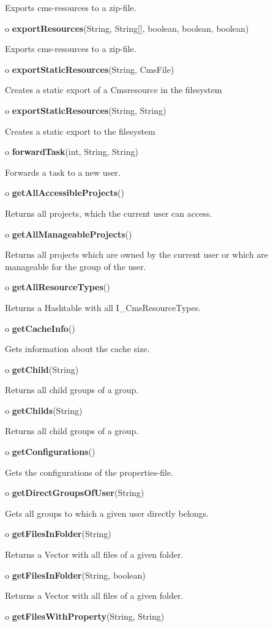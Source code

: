 \begin{description}
Exports cms-resources to a zip-file.
\item o {\bf exportResources}(String, String[], boolean, boolean, boolean)

Exports cms-resources to a zip-file.
\item o {\bf exportStaticResources}(String, CmsFile)

Creates a static export of a Cmsresource in the filesystem
\item o {\bf exportStaticResources}(String, String)

Creates a static export to the filesystem
\item o {\bf forwardTask}(int, String, String)

Forwards a task to a new user.
\item o {\bf getAllAccessibleProjects}()

Returns all projects, which the current user can access.
\item o {\bf getAllManageableProjects}()

Returns all projects which are owned by the current user or which are
manageable for the group of the user.
\item o {\bf getAllResourceTypes}()

Returns a Hashtable with all I\_CmsResourceTypes.
\item o {\bf getCacheInfo}()

Gets information about the cache size.
\item o {\bf getChild}(String)

Returns all child groups of a group.
\item o {\bf getChilds}(String)

Returns all child groups of a group.
\item o {\bf getConfigurations}()

Gets the configurations of the properties-file.
\item o {\bf getDirectGroupsOfUser}(String)

Gets all groups to which a given user directly belongs.
\item o {\bf getFilesInFolder}(String)

Returns a Vector with all files of a given folder.
\item o {\bf getFilesInFolder}(String, boolean)

Returns a Vector with all files of a given folder.
\item o {\bf getFilesWithProperty}(String, String)


\end{description}
